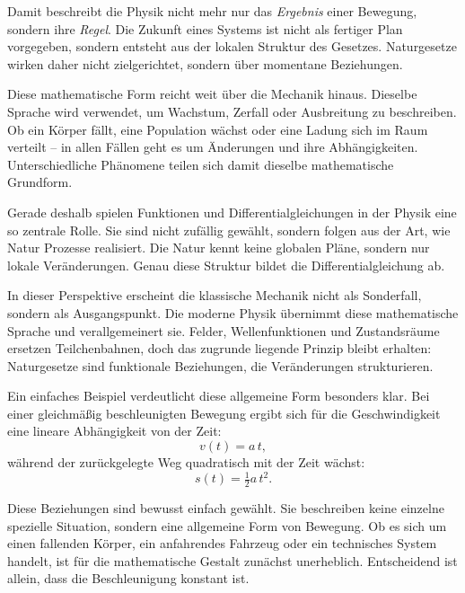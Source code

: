 Damit beschreibt die Physik nicht mehr nur das \emph{Ergebnis} einer Bewegung,
sondern ihre \emph{Regel}.
Die Zukunft eines Systems ist nicht als fertiger Plan vorgegeben,
sondern entsteht aus der lokalen Struktur des Gesetzes.
Naturgesetze wirken daher nicht zielgerichtet,
sondern über momentane Beziehungen.

Diese mathematische Form reicht weit über die Mechanik hinaus.
Dieselbe Sprache wird verwendet,
um Wachstum,
Zerfall
oder Ausbreitung zu beschreiben.
Ob ein Körper fällt,
eine Population wächst
oder eine Ladung sich im Raum verteilt --
in allen Fällen geht es um Änderungen
und ihre Abhängigkeiten.
Unterschiedliche Phänomene teilen sich damit dieselbe mathematische Grundform.

Gerade deshalb spielen Funktionen und Differentialgleichungen
in der Physik eine so zentrale Rolle.
Sie sind nicht zufällig gewählt,
sondern folgen aus der Art,
wie Natur Prozesse realisiert.
Die Natur kennt keine globalen Pläne,
sondern nur lokale Veränderungen.
Genau diese Struktur bildet die Differentialgleichung ab.

In dieser Perspektive erscheint die klassische Mechanik
nicht als Sonderfall,
sondern als Ausgangspunkt.
Die moderne Physik
übernimmt diese mathematische Sprache und verallgemeinert sie.
Felder,
Wellenfunktionen
und Zustandsräume
ersetzen Teilchenbahnen,
doch das zugrunde liegende Prinzip bleibt erhalten:
Naturgesetze sind funktionale Beziehungen,
die Veränderungen strukturieren.

Ein einfaches Beispiel verdeutlicht diese allgemeine Form besonders klar.
Bei einer gleichmäßig beschleunigten Bewegung
ergibt sich für die Geschwindigkeit eine lineare Abhängigkeit von der Zeit:
\[
v(t) = a\,t,
\]
während der zurückgelegte Weg quadratisch mit der Zeit wächst:
\[
s(t) = \tfrac{1}{2} a\, t^{2}.
\]

Diese Beziehungen sind bewusst einfach gewählt.
Sie beschreiben keine einzelne spezielle Situation,
sondern eine allgemeine Form von Bewegung.
Ob es sich um einen fallenden Körper,
ein anfahrendes Fahrzeug
oder ein technisches System handelt,
ist für die mathematische Gestalt zunächst unerheblich.
Entscheidend ist allein,
dass die Beschleunigung konstant ist.

